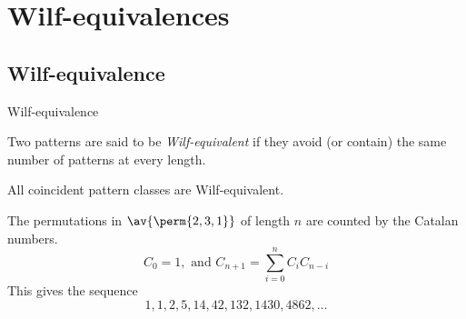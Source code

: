 \section{Wilf-equivalences}
\label{sec:Wilf-equivalences}
\subsection{Wilf-equivalence}
\label{sub:Wilf-equivalence}
\begin{frame}{Wilf-equivalence}
  \begin{definition}
  Two patterns are said to be \emph{Wilf-equivalent} if they avoid (or contain)
  the same number of patterns at every length.
\end{definition}
 All coincident pattern classes are Wilf-equivalent.

 The permutations in \(\av{\perm{2,3,1}}\) of length \(n\) are counted by the
 Catalan numbers.
 \begin{equation}
   C_0 = 1, \text{ and } C_{n+1} =\sum_{i=0}^{n}C_iC_{n-i}
 \end{equation}
 This gives the sequence
 \begin{equation*}
   1,1,2,5,14,42,132,1430,4862,\dotsc
 \end{equation*}
\end{frame}
